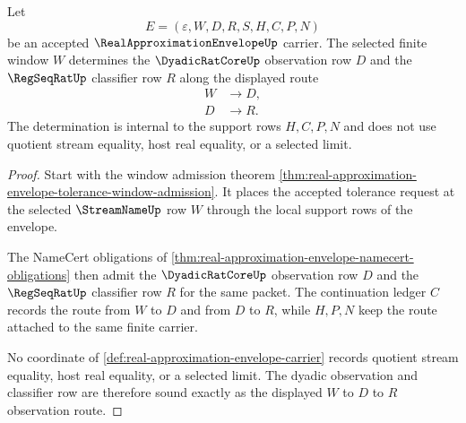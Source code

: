 \begin{theorem}
\label{thm:real-approximation-envelope-dyadic-observation-soundness}
Let
$$
E=(\varepsilon,W,D,R,S,H,C,P,N)
$$
be an accepted $\RealApproximationEnvelopeUp$ carrier. The selected finite window $W$ determines the $\DyadicRatCoreUp$ observation row $D$ and the $\RegSeqRatUp$ classifier row $R$ along the displayed route
$$
\begin{aligned}
W &\longrightarrow D,\\
D &\longrightarrow R.
\end{aligned}
$$
The determination is internal to the support rows $H,C,P,N$ and does not use quotient stream equality, host real equality, or a selected limit.
\end{theorem}
\begin{proof}
Start with the window admission theorem \autoref{thm:real-approximation-envelope-tolerance-window-admission}. It places the accepted tolerance request at the selected $\StreamNameUp$ row $W$ through the local support rows of the envelope.

The NameCert obligations of \autoref{thm:real-approximation-envelope-namecert-obligations} then admit the $\DyadicRatCoreUp$ observation row $D$ and the $\RegSeqRatUp$ classifier row $R$ for the same packet. The continuation ledger $C$ records the route from $W$ to $D$ and from $D$ to $R$, while $H,P,N$ keep the route attached to the same finite carrier.

No coordinate of \autoref{def:real-approximation-envelope-carrier} records quotient stream equality, host real equality, or a selected limit. The dyadic observation and classifier row are therefore sound exactly as the displayed $W$ to $D$ to $R$ observation route.
\end{proof}

